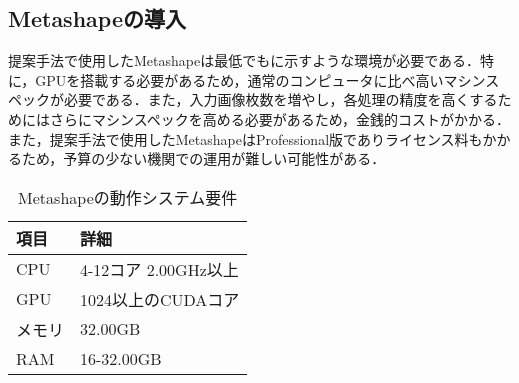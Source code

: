     \subsection*{Metashapeの導入}
      提案手法で使用したMetashapeは最低でもに示すような環境が必要である．特に，GPUを搭載する必要があるため，通常のコンピュータに比べ高いマシンスペックが必要である．また，入力画像枚数を増やし，各処理の精度を高くするためにはさらにマシンスペックを高める必要があるため，金銭的コストがかかる．また，提案手法で使用したMetashapeはProfessional版でありライセンス料もかかるため，予算の少ない機関での運用が難しい可能性がある．
      
      \begin{table}[tbp]
        \centering
        \caption{Metashapeの動作システム要件}
        \label{Metashapeの動作システム要件}
        \begin{tabular}{ll}
          \hline
          \textbf{項目} & \textbf{詳細} \\
          \hline \hline
          CPU & 4-12コア 2.00GHz以上 \\
          GPU & 1024以上のCUDAコア \\
          メモリ & 32.00GB \\
          RAM & 16-32.00GB \\ \hline
        \end{tabular}
      \end{table}
